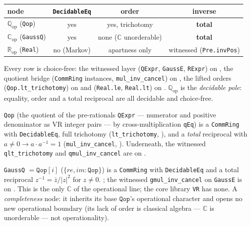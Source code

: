 \begin{center}
\begin{tabular}{lccc}
\textbf{node} & \textbf{\texttt{DecidableEq}} & \textbf{order} & \textbf{inverse} \\
\hline
$\mathbb{Q}_{\mathrm{op}}$ (\texttt{Qop})    & yes & yes, trichotomy & \textbf{total} \\
$\mathbb{C}_{\mathrm{op}}$ (\texttt{GaussQ}) & yes & none ($\mathbb{C}$ unorderable) & \textbf{total} \\
$\mathbb{R}_{\mathrm{op}}$ (\texttt{Real})   & no (Markov) & apartness only & witnessed (\texttt{Pre.invPos}) \\
\end{tabular}
\end{center}

\noindent Every row is choice-free: the witnessed layer (\texttt{QExpr},
\texttt{GaussE}, \texttt{RExpr}) on \axiomprofile{[]}, the quotient bridge
(\texttt{CommRing} instances, \texttt{mul\_inv\_cancel}) on ,
the lifted orders (\texttt{Qop.lt\_trichotomy}) on 
and (\texttt{Real.le}, \texttt{Real.lt}) on \axiomprofile{[propext]}.
$\mathbb{Q}_{\mathrm{op}}$ is the \emph{decidable pole}: equality, order and a total
reciprocal are all decidable and choice-free.

\begin{theorem}
\label{thm:continuum_qop}
\leanok
\texttt{Qop} (the quotient of the pre-rationals \texttt{QExpr} --- numerator and
positive denominator as VR integer pairs --- by cross-multiplication \texttt{qEq}) is a
\texttt{CommRing} with \texttt{DecidableEq}, full trichotomy
(\texttt{lt\_trichotomy}, ), and a \emph{total}
reciprocal with $a \ne 0 \to a \cdot a^{-1} = 1$ (\texttt{mul\_inv\_cancel},
).  Underneath, the witnessed \texttt{qlt\_trichotomy} and
\texttt{qmul\_inv\_cancel} are on \axiomprofile{[]}.
\end{theorem}

\begin{theorem}
\label{thm:continuum_gaussq}
\leanok
{}
\texttt{GaussQ} $= \texttt{Qop}[i]$ ($\{re, im : \texttt{Qop}\}$) is a \texttt{CommRing}
with \texttt{DecidableEq} and a total reciprocal $z^{-1} = \bar z/|z|^2$ for $z \ne 0$.
; the witnessed \texttt{gmul\_inv\_cancel} on
\texttt{GaussE} is on \axiomprofile{[]}.  This is the only $\mathbb{C}$ of the
operational line; the core library \texttt{VR} has none.  A \emph{completeness} node: it inherits its base
$\texttt{Qop}$'s operational character and opens no new operational boundary (its lack
of order is classical algebra --- $\mathbb{C}$ is unorderable --- not operationality).
\end{theorem}

